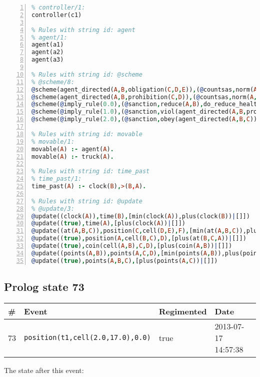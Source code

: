 \documentclass[11pt]{article}\usepackage[utf8]{inputenc}\usepackage{geometry}
\begin{document}
\begin{lstlisting}[language=Prolog, numbers=left]
% Rules with string id: controller
% controller/1:
controller(c1)

% Rules with string id: agent
% agent/1:
agent(a1)
agent(a2)
agent(a3)

% Rules with string id: @scheme
% @scheme/8:
@scheme(agent_directed(A,B,obligation(C,D,E)),(@countsas,norm(A,B,F,obligation(C,D,E)),F),false,(listTrue(C)),(time_past(D)),false,[plus(viol(agent_directed(A,B,obligation(C,D,E))))|[]],[plus(obey(agent_directed(A,B,obligation(C,D,E))))|[]])
@scheme(agent_directed(A,B,prohibition(C,D)),(@countsas,norm(A,B,E,prohibition(C,D)),E),(listTrue(C)),false,(false),false,[plus(viol(agent_directed(A,B,prohibition(C,D))))|[]],[plus(obey(agent_directed(A,B,prohibition(C,D))))|[]])
@scheme(@imply_rule(0.0),(@sanction,reduce(A,B),do_reduce_health(A,B),notifyAgent(A,changed(status))),true,false,false,false,[min(reduce(A,B))|[]],[])
@scheme(@imply_rule(1.0),(@sanction,viol(agent_directed(A,B,prohibition(C,D))),do_sanction(D)),true,false,false,false,[min(viol(agent_directed(A,B,prohibition(C,D))))|[]],[])
@scheme(@imply_rule(2.0),(@sanction,obey(agent_directed(A,B,C))),true,false,false,false,[min(obey(agent_directed(A,B,C)))|[]],[])

% Rules with string id: movable
% movable/1:
movable(A) :- agent(A).
movable(A) :- truck(A).

% Rules with string id: time_past
% time_past/1:
time_past(A) :- clock(B),>(B,A).

% Rules with string id: @update
% @update/3:
@update((clock(A)),time(B),[min(clock(A)),plus(clock(B))|[]])
@update((true),time(A),[plus(clock(A))|[]])
@update((at(A,B,C)),position(C,cell(D,E),F),[min(at(A,B,C)),plus(at(D,E,C))|[]])
@update((true),position(A,cell(B,C),D),[plus(at(B,C,A))|[]])
@update((true),coin(cell(A,B),C,D),[plus(coin(A,B))|[]])
@update((points(A,B)),points(A,C,D),[min(points(A,B)),plus(points(A,D))|[]])
@update((true),points(A,B,C),[plus(points(A,C))|[]])

\end{lstlisting}
\clearpage 
\subsection{Prolog state 73}
\begin{table}[ht]
\centering 
\begin{tabular}{l l l l} 
\textbf{\#} & \textbf{Event} & \textbf{Regimented} & \textbf{Date} \\ [0.5ex] 
\hline
73&\texttt{position(t1,cell(2.0,17.0),0.0)}&true&2013-07-17 14:57:38\\ [1ex] \hline\end{tabular}
\end{table}
The state after this event:
\end{document}
